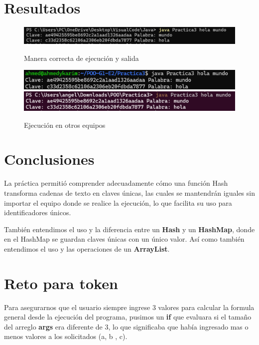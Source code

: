 \documentclass[letterpaper,12pt]{article}
\begin{document}
\section{Resultados}

\begin{figure}[H]
    \centering
    \includegraphics[width=1\textwidth]{Imagenes/ejecucion.png}
    \caption*{Manera correcta de ejecución y salida}
    \includegraphics[width=1\textwidth]{Imagenes/hola.png}
    \includegraphics[width=1\textwidth]{Imagenes/image.png}    
    \caption*{Ejecución en otros equipos}
\end{figure}

\clearpage

\section{Conclusiones}
La práctica permitió comprender adecuadamente cómo una función Hash transforma cadenas de texto en claves únicas, las cuales se mantendrán iguales sin importar el equipo donde se realice la ejecución, lo que facilita su uso para identificadores únicos. 

También entendimos el uso y la diferencia entre un \textbf{Hash} y un \textbf{HashMap}, donde en el HashMap se guardan claves únicas con un único valor. Así como también entendimos el uso y las operaciones de un \textbf{ArrayList}.

\printbibliography

\clearpage

\section{Reto para token}

Para asegurarnos que el usuario siempre ingrese 3 valores para calcular la formula general desde la ejecución del programa, pusimos un \textbf{if} que evaluara si el tamaño del arreglo \textbf{args} era diferente de 3, lo que significaba que había ingresado mas o menos valores a los solicitados (a, b , c).
\end{document}
